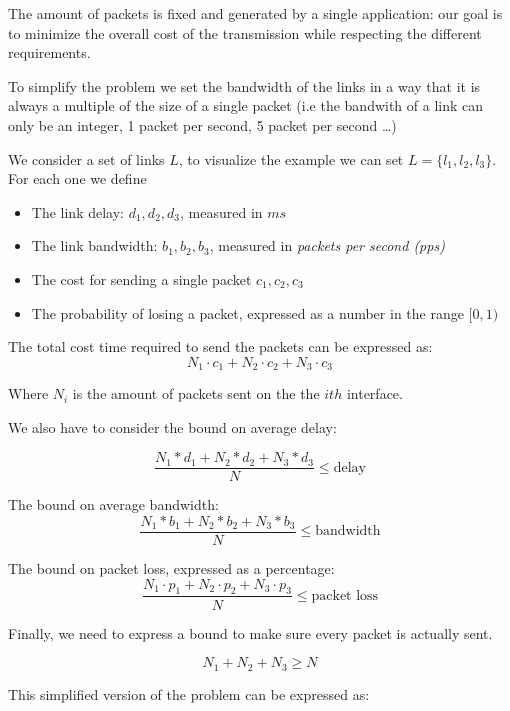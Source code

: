 	The amount of packets is fixed and generated by a single application: our goal is to minimize the overall cost of the transmission while respecting the different requirements.
	
	To simplify the problem we set the bandwidth of the links in a way that it is always a multiple of the size of a single packet (i.e the bandwith of a link can only be an integer, 1 packet per second, 5 packet per second \dots)
	
	
	We consider a set of links $L$, to visualize the example we can set  $L = \{l_1, l_2, l_3 \}$. \\
	
	For each one we define
	\begin{itemize}
		\item The link delay:  $d_1, d_2, d_3$, measured in $ms$
		\item The link bandwidth: $b_1, b_2, b_3$, measured in \textit{packets per second (pps)}
		\item The cost for sending a single packet $c_1, c_2, c_3$
		\item The probability of losing a packet, expressed as a number in the range $ [0, 1)$
	\end{itemize}
	
	The total cost time required to send the packets can be expressed as:
	\[
	N_1 \cdot c_1 +
	N_2 \cdot c_2 +
	N_3 \cdot c_3 
	\]
	
	Where $N_i$ is the amount of packets sent on the the $ith$ interface.
	
	We also have to consider the bound on average delay:
	
	\[
	\frac
	{N_1 * d_1 + N_2 * d_2  + N_3 * d_3 }
	{N}
	\le \text{delay}
	\]
	
	The bound on average bandwidth:
	\[
	\frac
	{N_1 * b_1 + N_2 * b_2  + N_3 * b_3 }
	{N}
	\le \text{bandwidth}
	\]
	
	The bound on packet loss, expressed as a percentage:
	\[
	\frac
	{N_1 \cdot p_1 + N_2 \cdot p_2 + N_3 \cdot p_3 }
	{N}
	\le \text{packet loss}
	\]
	
	Finally, we need to express a bound to make sure every packet is actually sent.
	
	\[
	N_1 + N_2 + N_3 \ge N
	\]
	
	This simplified version of the problem can be expressed as: 
	
